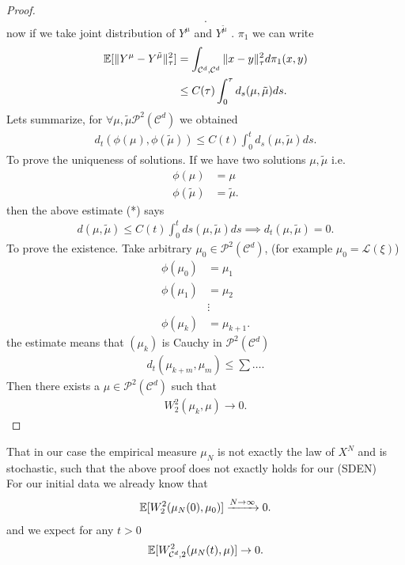\begin{proof}
\begin{align*}
 .\end{align*}
 now if we take joint distribution of $Y^{\mu } $ and $Y^{\tilde{\mu } }$ . $\pi_1$ we can write 
 \begin{align*}
   \mathbb{E}[\|Y^{\mu }-Y^{\tilde{\mu } } \|_\tau^2 ] &= \int_{\mathcal{C}^{d},\mathcal{C}^{d}  } \|x-y\|_{\tau }^{2} d\pi_1(x,y)  \\
                                               &\le  C(\tau ) \int_0^{\tau } d_s(\mu ,\tilde{\mu } )ds
 .\end{align*}
 Lets summarize, for $\forall  \mu , \tilde{\mu } \mathcal{P}^2(\mathcal{C}^{d} ) $ we obtained 
 \begin{align*}
   d_t(\phi(\mu ),\phi(\tilde{\mu } )) \le C(t) \int_0^{t} d_s(\mu ,\tilde{\mu } ) ds \tag{*}
 .\end{align*}
To prove the uniqueness of solutions. If we have two solutions $\mu ,\tilde{\mu } $ i.e. 
\begin{align*}
  \phi(\mu ) &= \mu \\
  \phi(\tilde{\mu } ) &= \tilde{\mu } 
.\end{align*}
then the above estimate (*) says 
\begin{align*}
  d(\mu,\tilde{\mu } ) \le  C(t) \int_0^{t} ds(\mu ,\tilde{\mu } )  ds \implies d_t(\mu ,\tilde{\mu } )  = 0
.\end{align*}
To prove the existence. Take arbitrary $\mu_0 \in  \mathcal{P}^2(\mathcal{C}^{d} )$, (for example $\mu_0 = \mathcal{L}(\xi)$)
\begin{align*}
  \phi(\mu_0) &= \mu_1 \\
  \phi(\mu_1) &= \mu_2 \\
              &\vdots \\
  \phi(\mu_k) &= \mu_{k+1}
.\end{align*}
the estimate means that $(\mu_k)$ is Cauchy in $\mathcal{P}^2(\mathcal{C}^{d} )$
\begin{align*}
  d_t(\mu_{k+m},\mu_m) \le  \sum \ldots 
.\end{align*}
Then there exists a $\mu \in \mathcal{P}^2(\mathcal{C}^{d} )$ such that 
\begin{align*}
  W_2^{2}(\mu_k,\mu ) \to  0 
.\end{align*}
\end{proof}
\begin{remark}
 That in our case the empirical measure $\mu_N$ is not exactly the law of $X^{N} $ and is 
 stochastic, such that the above proof does not exactly holds for our (SDEN)\\
 For our initial data we already know that 
 \begin{align*}
   \mathbb{E}[W_2^2(\mu_N(0),\mu_0  )] \xrightarrow{N\to \infty} 0
 .\end{align*}
 and we expect for any $t>0$
 \begin{align*}
   \mathbb{E}[W_{\mathcal{C}^{d},2 }^2(\mu_N(t),\mu )] \to 0
 .\end{align*}
\end{remark}
